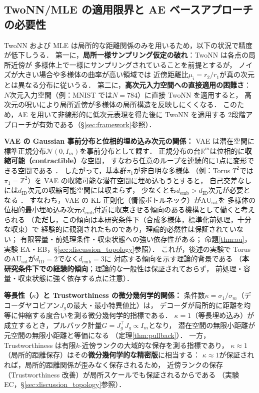 \documentclass[12pt,a4paper]{jsarticle}
\newcommand{\dID}{d_{\mathrm{ID}}}
\newcommand{\Jg}{J_g}
\newcommand{\R}{\mathbb{R}}
\newcommand{\kap}{\kappa}
\newcommand{\AUsat}{\mathrm{AU}_{\mathrm{sat}}}
\newcommand{\demb}{d_{\mathrm{emb}}}
\begin{document}
\subsection{TwoNN/MLE の適用限界と AE ベースアプローチの必要性}\label{sec:related_topology}

TwoNN および MLE は局所的な距離関係のみを用いるため，以下の状況で精度が低下しうる．
第一に，\textbf{局所一様サンプリング仮定の破れ}：TwoNN は各点の局所近傍が
多様体上で一様にサンプリングされていることを前提とするが，
ノイズが大きい場合や多様体の曲率が高い領域では
近傍距離比$\mu_i = r_2/r_1$が真の次元とは異なる分布に従いうる\cite{facco2017twonn}．
第二に，\textbf{高次元入力空間への直接適用の困難さ}：
$N$次元入力空間（例：MNIST では$N = 784$）に直接 TwoNN を適用すると，
高次元の呪いにより局所近傍が多様体の局所構造を反映しにくくなる．
このため，AE を用いて非線形的に低次元表現を得た後に TwoNN を適用する
2段階アプローチが有効である（§\ref{sec:framework}参照）．

\textbf{VAE の Gaussian 事前分布と位相的埋め込み次元の関係：}
VAE は潜在空間に標準正規分布$\mathcal{N}(0, I_m)$を事前分布として課す．
正規分布の台$\R^m$は位相的に\textbf{収縮可能（contractible）}な空間，
すなわち任意のループを連続的に1点に変形できる空間である
\cite{hatcher2002algebraic}．
したがって，基本群$\pi_1$が非自明な多様体
（例：Torus $T^2$では$\pi_1 = \mathbb{Z}^2$）を
VAE の収縮可能な潜在空間に埋め込もうとすると，
自己交差なしには$\dID$次元の収縮可能空間には収まらず，
少なくとも$\demb > \dID$次元が必要となる
\cite{hatcher2002algebraic,guillemin1974differential}．
すなわち，VAE の KL 正則化（情報ボトルネック）が$\AUsat$を
多様体の位相的最小埋め込み次元$\demb$付近に収束させる傾向のある機構として働くと考えられる
（\textbf{ただし}，この傾向は本研究条件下（合成多様体，標準化前処理，十分な収束）で
経験的に観測されたものであり，理論的必然性は保証されていない；
有限容量・前処理条件・収束状態への強い依存性がある；
命題\ref{thm:au}，実験 EA・EB，§\ref{sec:discussion_topology}参照）．
これが，後述の実験で Torus の$\AUsat$が$\dID = 2$でなく$\demb = 3$に
対応する傾向を示す理論的背景である
（\textbf{本研究条件下での経験的傾向}；理論的な一般性は保証されておらず，
前処理・容量・収束状態に強く依存する点に注意）．

\textbf{等長性（$\kap$）と Trustworthiness の微分幾何学的関係：}
条件数$\kap = \sigma_1/\sigma_m$（デコーダヤコビアン$\Jg$の最大・最小特異値比）は，
デコーダが局所的に距離を均等に伸縮する度合いを測る微分幾何学的指標である．
$\kap = 1$（等長埋め込み）が成立するとき，プルバック計量$G = \Jg^\top\Jg \propto I_m$となり，
潜在空間の無限小距離が元空間の無限小距離と等価になる
（定理\ref{thm:pullback}）．
一方，Trustworthiness は有限$k$-近傍ランクの大域的な保存を測る指標であり，
$\kap \approx 1$（局所的距離保存）はその\textbf{微分幾何学的な精密版}に相当する：
$\kap \approx 1$が保証されれば，局所的距離関係が歪みなく保存されるため，
近傍ランクの保存（Trustworthiness 改善）が局所スケールでも保証されるからである
（実験 EC，§\ref{sec:discussion_topology}参照）．
\end{document}
